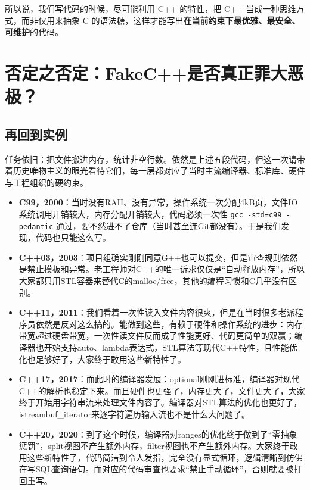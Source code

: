 所以说，我们写代码的时候，尽可能利用 C++ 的特性，把 C++ 当成一种思维方式，而非仅用来抽象 C 的语法糖，这样才能写出\textbf{在当前约束下最优雅、最安全、可维护}的代码。

\section{否定之否定：FakeC++是否真正罪大恶极？}

\subsection{再回到实例}

任务依旧：把文件搬进内存，统计非空行数。依然是上述五段代码，但这一次请带着历史唯物主义的眼光看待它们，每一层都对应了当时主流编译器、标准库、硬件与工程组织的硬约束。

\begin{itemize}
    \item \textbf{C99，2000}：当时没有RAII、没有异常，操作系统一次分配4kB页，文件IO系统调用开销较大，内存分配开销较大，代码必须一次性 \texttt{gcc -std=c99 -pedantic} 通过，要不然进不了仓库（当时甚至连Git都没有）。于是我们发现，代码也只能这么写。
    \item \textbf{C++03，2003}：项目组确实刚刚同意G++也可以提交，但是审查规则依然是禁止模板和异常。老工程师对C++的唯一诉求仅仅是“自动释放内存”，所以大家都只用STL容器来替代C的malloc/free，其他的编程习惯和C几乎没有区别。
    \item \textbf{C++11，2011}：我们看着一次性读入文件内容很爽，但是在当时很多老派程序员依然是反对这么搞的。能做到这些，有赖于硬件和操作系统的进步：内存带宽超过硬盘带宽，一次性读文件反而成了性能更好、代码更简单的双赢；编译器也开始支持auto、lambda表达式，STL算法等现代C++特性，且性能优化也足够好了，大家终于敢用这些新特性了。
    \item \textbf{C++17，2017}：而此时的编译器发展：optional刚刚进标准，编译器对现代C++的解析也稳定下来。而且硬件也更强了，内存更大了，文件更大了，大家终于开始用字符串流来处理文件内容了。编译器对STL算法的优化也更好了，istreambuf\_iterator来逐字符遍历输入流也不是什么大问题了。
    \item \textbf{C++20，2020}：到了这个时候，编译器对ranges的优化终于做到了“零抽象惩罚”，split视图不产生额外内存，filter视图也不产生额外内存。大家终于敢用这些新特性了，代码简洁到令人发指，完全没有显式循环，逻辑清晰到仿佛在写SQL查询语句。而对应的代码审查也要求“禁止手动循环”，否则就要被打回重写。
\end{itemize}

